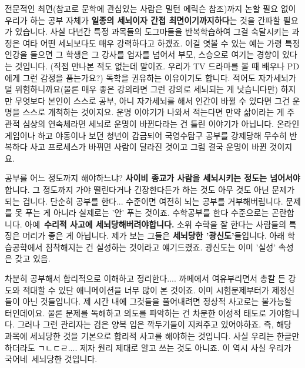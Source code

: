 전문적인 최면(참고로 문학에 관심있는 사람은 밀턴 에릭슨 참조)까지 논할 필요 없이
우리가 하는 공부 자체가 \textbf{일종의 세뇌이자 간접 최면이기까지하다}는 것을 간파할 필요가 있습니다.
사실 다년간 특정 과목들의 도그마들을 반복학습하여 그걸 숙달시키는 과정은 여타 어떤 세뇌보다도 매우 강력하다고 하겠죠.
이걸 엿볼 수 있는 예는 가령 특정 인강을 들으면 그 학생은 그 강사를 업자를 넘어서 부모, 스승으로 여기는 경향이 있다는 것입니다.
(직접 만나본 적도 없는데 말이죠. 우리가 TV 드라마를 볼 때 배우나 PD에게 그런 감정을 품는가요?)
독학을 권유하는 이유이기도 합니다. 적어도 자가세뇌가 덜 위험하니까요(물론 매우 좋은 강의라면 그런 강의로 세뇌되는 게 낫습니다만)
하지만 무엇보다 본인이 스스로 공부, 아니 자가세뇌를 해서 인간이 바뀔 수 있다면 그건 운명을 스스로 개척하는 것이지요.
운명 이야기가 나와서 적는다면 만약 삶이라는 게 주관적 심상의 연속체라면 세뇌로 운명이 바뀐다라는 건 틀린 이야기가 아닙니다.
온라인 게임이나 하고 야동이나 보던 청년이 감금되어 국영수탐구 공부를 강제당해 무수히 반복하다
사고 프로세스가 바뀌면 사람이 달라진 것이고 그럼 결국 운명이 바뀐 것이지요.
\vspace{5mm}

공부를 어느 정도까지 해야하느냐? \textbf{사이비 종교가 사람을 세뇌시키는 정도는 넘어서야} 합니다.
그 정도까지 가야 떨린다거나 긴장한다든가 하는 것도 아무 것도 아닌 문제가 되는 겁니다.
단순히 공부를 한다... 수준이면 여전히 뇌는 공부를 거부해버립니다. 문제를 못 푸는 게 아니라 실제로는 '안' 푸는 것이죠.
수학공부를 한다 수준으로는 곤란합니다. 아예 \textbf{수리적 사고에 세뇌당해버려야합니다.}
소위 수학을 잘 한다는 사람들의 특징은 머리가 좋은 게 아닙니다. 제가 보는 그들은 \textbf{세뇌당한 '광신도'}들입니다.
아래 학습공학에서 침착해지는 건 실성하는 것이라고 얘기드렸죠. 광신도는 이미 '실성' 속성은 갖고 있음.
\vspace{5mm}

차분히 공부해서 합리적으로 이해하고 정리한다.... 까페에서 여유부리면서 총칼 든 강도와 적대할 수 있단 애니메이션을 너무 많이 본 것이죠.
이미 시험문제부터가 제정신들이 아닌 것들입니다. 제 시간 내에 그것들을 풀어내려면 정상적 사고로는 불가능할 터인데이요.
물론 문제를 독해하고 의도를 파악하는 건 차분한 이성적 태도로 가야합니다.
그러나 그런 관리자는 검은 양복 입은 깍두기들이 지켜주고 있어야하죠. 즉, 해당 과목에 세뇌당한 것을 기본으로 합리적 사고를 해야하는 것입니다.
사실 우리는 한글만 하더라도 ㄱㄴㄷㄹ.... 제자 원리 제대로 알고 쓰는 것도 아니죠. 이 역시 사실 우리가 국어네 세뇌당한 것입니다.
\vspace{5mm}

